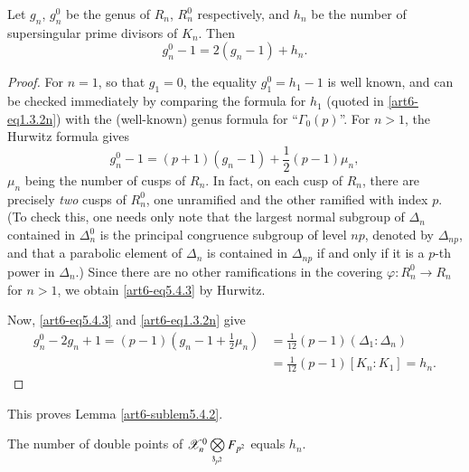 \begin{sublemma}\label{art6-sublem5.4.2}
Let $g_n$, $g^0_n$ be the genus of $R_n$, $R^0_n$ respectively, and $h_n$ be the number of supersingular prime divisors of $K_n$. Then
$$
g^0_n -1  = 2 (g_n - 1) + h_n .
$$
\end{sublemma}

\begin{proof}
For $n = 1$, so that $g_1 = 0$, the equality $g^0_1 = h_1 -1$ is well known, and can be checked immediately by comparing the formula for $h_1$ (quoted in \ref{art6-eq1.3.2n}) with the (well-known) genus formula for ``$\Gamma_0 (p)$''. For $n>1$, the Hurwitz formula gives
\begin{equation}
g^0_n - 1 = (p+1) (g_n - 1) + \frac{1}{2} (p-1) \mu_n, \label{art6-eq5.4.3}
\end{equation}
$\mu_n$ being the number of cusps of $R_n$. In fact, on each cusp of $R_n$, there are precisely \textit{two} cusps of $R^0_n$, one unramified and the other ramified with index $p$. (To check this, one needs only note that the largest normal subgroup of $\Delta_n$ contained in $\Delta^0_n$ is the principal congruence subgroup of level $np$, denoted by $\Delta_{np}$, and that a parabolic element of $\Delta_n$ is contained in $\Delta_{np}$ if and only if it is a $p$-th power in $\Delta_n$.) Since there are no other ramifications in the covering $\varphi: R^0_n \to R_n$ for $n >1$, we obtain \eqref{art6-eq5.4.3} by Hurwitz.

Now, \eqref{art6-eq5.4.3} and \ref{art6-eq1.3.2n} give
\begin{align*}
g^0_n - 2 g_n  +1 = (p-1) (g_n - 1 + \frac{1}{2} \mu_n) & = \frac{1}{12} (p-1) (\Delta_1 : \Delta_n)\\
& = \frac{1}{12} (p-1) [K_n : K_1] = h_n.
\end{align*}
\end{proof}
This proves Lemma \ref{art6-sublem5.4.2}.


\begin{sublemma}\label{art6-sublem5.4.4}
The number of double points of $\mathscr{X}^0_n \bigotimes\limits_{\mathfrak{z}_{p^2}} F_{p^2}$ equals $h_n$.
\end{sublemma}

